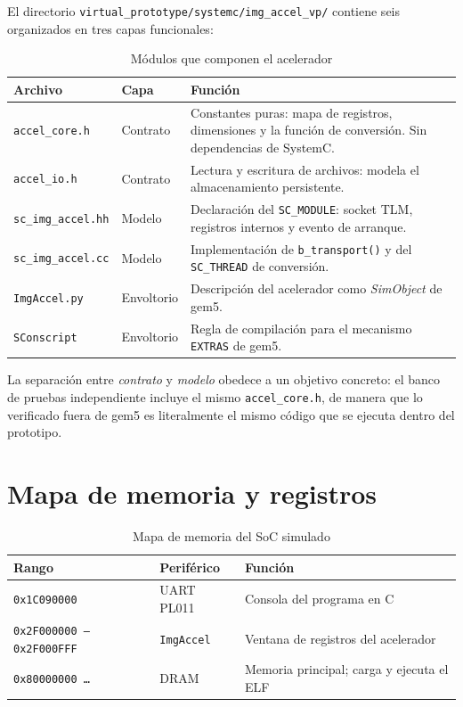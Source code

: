 \documentclass[11pt,letterpaper]{article}
\begin{document}
El directorio \texttt{virtual\_prototype/systemc/img\_accel\_vp/} contiene seis
organizados en tres capas funcionales:

\begin{table}[H]
\centering
\caption{Módulos que componen el acelerador}
\begin{tabular}{@{}p{3.5cm}p{2.2cm}p{8.5cm}@{}}
\toprule
\textbf{Archivo} & \textbf{Capa} & \textbf{Función} \\
\midrule
\texttt{accel\_core.h}    & Contrato   & Constantes puras: mapa de registros,
  dimensiones y la función de conversión. Sin dependencias de SystemC. \\
\texttt{accel\_io.h}      & Contrato   & Lectura y escritura de archivos:
  modela el almacenamiento persistente. \\
\texttt{sc\_img\_accel.hh}& Modelo     & Declaración del \texttt{SC\_MODULE}:
  socket TLM, registros internos y evento de arranque. \\
\texttt{sc\_img\_accel.cc}& Modelo     & Implementación de \texttt{b\_transport()}
  y del \texttt{SC\_THREAD} de conversión. \\
\texttt{ImgAccel.py}      & Envoltorio & Descripción del acelerador como
  \emph{SimObject} de gem5. \\
\texttt{SConscript}       & Envoltorio & Regla de compilación para el mecanismo
  \texttt{EXTRAS} de gem5. \\
\bottomrule
\end{tabular}
\end{table}

La separación entre \emph{contrato} y \emph{modelo} obedece a un objetivo
concreto: el banco de pruebas independiente incluye el mismo
\texttt{accel\_core.h}, de manera que lo verificado fuera de gem5 es
literalmente el mismo código que se ejecuta dentro del prototipo.

\section{Mapa de memoria y registros}
\label{sec:mapa-vp}

\begin{table}[H]
\centering
\caption{Mapa de memoria del SoC simulado}
\begin{tabular}{@{}lll@{}}
\toprule
\textbf{Rango} & \textbf{Periférico} & \textbf{Función} \\
\midrule
\texttt{0x1C090000}                 & UART PL011 & Consola del programa en C \\
\texttt{0x2F000000 -- 0x2F000FFF}   & \texttt{ImgAccel} & Ventana de registros
  del acelerador \\
\texttt{0x80000000 \ldots}          & DRAM & Memoria principal; carga y ejecuta
  el ELF \\
\bottomrule
\end{tabular}
\end{table}
\end{document}
